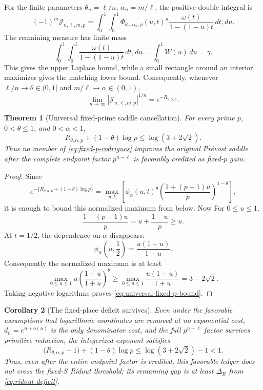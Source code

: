 \documentclass[11pt]{article}
\newtheorem{theorem}{Theorem}[section]
\newtheorem{corollary}[theorem]{Corollary}
\theoremstyle{definition}
\theoremstyle{remark}
\begin{document}
For the finite parameters \(\theta_n=\ell/n\),
\(\alpha_n=m/\ell\), the positive double integral is
\[
 (-1)^m\mathcal J_{n,\ell,m,p}
 =\int_0^1\!\int_0^1
 \Phi_{\theta_n,\alpha_n,p}(u,t)^n
 \frac{\omega(t)}{1-(1-u)t}\,dt,du.
\]
The remaining measure has finite mass
\[
 \int_0^1\!\int_0^1
 \frac{\omega(t)}{1-(1-u)t}\,dt,du
 =\int_0^1W(u)\,du=\gamma.
\]
This gives the upper Laplace bound, while a small rectangle around an
interior maximizer gives the matching lower bound.  Consequently,
whenever \(\ell/n\to\theta\in(0,1]\) and
\(m/\ell\to\alpha\in(0,1)\),
\begin{equation}\label{eq:fixed-p-laplace}
 \lim_{n\to\infty}|\mathcal J_{n,\ell,m,p}|^{1/n}
 =e^{-R_{\theta,\alpha,p}}.
\end{equation}

\begin{theorem}[Universal fixed-prime saddle cancellation]
\label{thm:universal-fixed-p-cancellation}
For every prime \(p\), \(0<\theta\le1\), and \(0<\alpha<1\),
\begin{equation}\label{eq:universal-fixed-p-bound}
 \boxed{\displaystyle
 R_{\theta,\alpha,p}+(1-\theta)\log p
 \le\log(3+2\sqrt2).}
\end{equation}
Thus no member of \eqref{eq:fixed-p-rodrigues} improves the original
Pr\'evost saddle after the complete endpoint factor
\(p^{n-\ell}\) is favorably credited as fixed-\(p\) gain.
\end{theorem}

\begin{proof}
Since
\[
 e^{-\{R_{\theta,\alpha,p}+(1-\theta)\log p\}}
 =\max_{u,t}
 \left[
  \phi_\alpha(u,t)^\theta
  \left(\frac{1+(p-1)u}{p}\right)^{1-\theta}
 \right],
\]
it is enough to bound this normalized maximum from below.  Now
For \(0\le u\le1\),
\[
 \frac{1+(p-1)u}{p}=u+\frac{1-u}{p}\ge u.
\]
At \(t=1/2\), the dependence on \(\alpha\) disappears:
\[
 \phi_\alpha\!\left(u,\frac12\right)
 =\frac{u(1-u)}{1+u}.
\]
Consequently the normalized maximum is at least
\[
 \max_{0\le u\le1}
 u\left(\frac{1-u}{1+u}\right)^\theta
 \ge\max_{0\le u\le1}\frac{u(1-u)}{1+u}
 =3-2\sqrt2.
\]
Taking negative logarithms proves \eqref{eq:universal-fixed-p-bound}.
\end{proof}

\begin{corollary}[The fixed-place deficit survives]
\label{cor:fixed-p-deficit}
Even under the favorable assumptions that logarithmic coordinates are
removed at no exponential cost, \(d_n=e^{n+o(n)}\) is the only denominator
cost, and the full \(p^{n-\ell}\) factor survives primitive reduction, the
integerized exponent satisfies
\[
 \bigl(R_{\theta,\alpha,p}-1\bigr)+(1-\theta)\log p
 \le\log(3+2\sqrt2)-1<1.
\]
Thus, even after the entire endpoint factor is credited, this favorable
ledger does not cross the fixed-\(S\) Ridout threshold; its remaining gap is
at least \(\Delta_R\) from \eqref{eq:ridout-deficit}.
\end{corollary}
\end{document}
